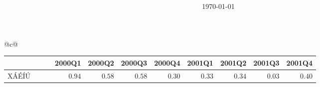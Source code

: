 \documentclass[10pt,letterpaper]{article}
\title{{\mylcmss\bfseries }}
\author{}
\date{\today}
\begin{document}
\pagestyle{myheadings}





\centering


\begin{tabular}[t]{@{\hspace*{-3pt}}c@{ }}
\\[7pt]
{
\renewcommand{\arraystretch}{1.15}
\begin{tabular}{lllrrrrrrrr}
\hline
&&&\multicolumn{1}{c}{{2000Q1}}&\multicolumn{1}{c}{{2000Q2}}&\multicolumn{1}{c}{{2000Q3}}&\multicolumn{1}{c}{{2000Q4}}&\multicolumn{1}{c}{{2001Q1}}&\multicolumn{1}{c}{{2001Q2}}&\multicolumn{1}{c}{{2001Q3}}&\multicolumn{1}{c}{{2001Q4}}\\
\hline
XÁÉÍÚ & ~ &  & {\ensuremath{0.94}} & {\ensuremath{0.58}} & {\ensuremath{0.58}} & {\ensuremath{0.30}} & {\ensuremath{0.33}} & {\ensuremath{0.34}} & {\ensuremath{0.03}} & {\ensuremath{0.40}} \\
\hline
\end{tabular}}
\end{tabular}%
\end{document}
